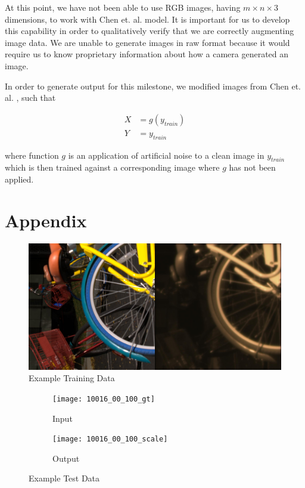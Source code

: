 \documentclass{article}
\begin{document}
At this point, we have not been able to use RGB images, having
$m \times n \times 3$ dimensions, to work with Chen et. al.
\cite{chen2018learning} model. It is important for us to develop this
capability in order to qualitatively verify that we are correctly augmenting
image data. We are unable to generate images in raw format because
it would require us to know proprietary information about how a camera
generated an image.

In order to generate output for this milestone, we modified images from
Chen et. al. \cite{chen2018learning}, such that

\begin{align*}
  X &= g(y_{train})\\
  Y &= y_{train}
\end{align*}

where function $g$ is an application of artificial noise to a clean
image in $y_{train}$ which is then trained against a corresponding
image where $g$ has not been applied.


\section{Appendix}

\begin{figure}[ht]
  \centering
  \includegraphics[scale=0.1]{00002_00_train_100}
  \caption{ Example Training Data}
  \label{fig:train}
\end{figure}

\begin{figure}[ht]
  \centering
  \begin{subfigure}[t]{0.3\textwidth}
    \texttt{[image: 10016\_00\_100\_gt]}
    \caption{Input}
  \end{subfigure}
  \begin{subfigure}[t]{0.3\textwidth}
    \texttt{[image: 10016\_00\_100\_scale]}
    \caption{Output}
  \end{subfigure}
  \caption{ Example Test Data}
  \label{fig:test}
\end{figure}




\end{document}
